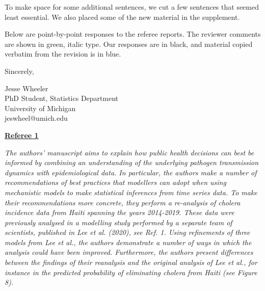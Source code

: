 \documentclass[11pt]{article}
\newcommand\report[1]{{\color{mygreen} \vspace{1mm}\hspace{0.25in}\parbox{6in}{\em #1}}}
\begin{document}
To make space for some additional sentences, we cut a few sentences that seemed least essential. We also placed some of the new material in the supplement.

Below are point-by-point responses to the referee reports.
The reviewer comments are shown in green, italic type.
Our responses are in black, and material copied verbatim from the revision is in blue.


\vspace{3mm}

Sincerely,




Jesse Wheeler \\
PhD Student, Statistics Department \\
University of Michigan\\
jeswheel@umich.edu

\vspace{5mm}

\newpage


\begin{center}
{\large{\textbf{\underline{Referee 1}}}} %
\end{center}

\report{
  The authors' manuscript aims to explain how public health decisions can best be informed by combining an understanding of the underlying pathogen transmission dynamics with epidemiological data. In particular, the authors make a number of recommendations of best practices that modellers can adopt when using mechanistic models to make statistical inferences from time series data. To make their recommendations more concrete, they perform a re-analysis of cholera incidence data from Haiti spanning the years 2014-2019. These data were previously analysed in a modelling study performed by a separate team of scientists, published in Lee et al. (2020), see Ref. 1. Using refinements of three models from Lee et al., the authors demonstrate a number of ways in which the analysis could have been improved. Furthermore, the authors present differences between the findings of their reanalysis and the original analysis of Lee et al., for instance in the predicted probability of eliminating cholera from Haiti (see Figure 8).
}
\end{document}
